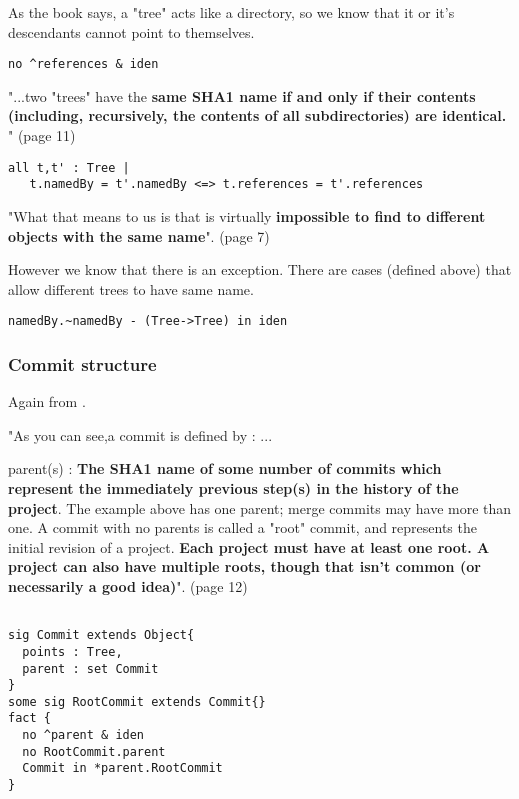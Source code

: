 As the book \cite{gitComm} says, a "tree" acts
like a directory, so we know that it or it's 
descendants cannot point to themselves.
\begin{lstlisting}
no ^references & iden 
\end{lstlisting}

"...two "trees" have the { \bf same SHA1 name if and only if their
contents (including, recursively, the contents of all subdirectories)
are identical.} " (page 11)

\begin{lstlisting}
all t,t' : Tree | 
   t.namedBy = t'.namedBy <=> t.references = t'.references
\end{lstlisting}

"What that means to us is that is virtually {\bf impossible to find to 
different objects with the same name}". (page 7) \par
However we know that there is an exception. 
There are cases (defined above)
that allow different trees to have same name. 

\begin{lstlisting}
namedBy.~namedBy - (Tree->Tree) in iden
\end{lstlisting}


\subsubsection{Commit structure}

Again from \cite{gitComm}. \par 
"As you can see,a commit is defined by :
... \par
parent(s) : {\bf The SHA1 name of some number of commits which
represent the immediately previous step(s) in the 
history of the project}. The example above has one parent;
merge commits may have more than one. A commit with no 
parents is called a "root" commit, and represents the 
initial revision of a project. {\bf Each project must have at
least one root. A project can also have multiple roots,
though that isn't common (or necessarily a good idea)}". (page 12)

\begin{lstlisting}

sig Commit extends Object{
  points : Tree,
  parent : set Commit
}
some sig RootCommit extends Commit{}
fact {
  no ^parent & iden
  no RootCommit.parent
  Commit in *parent.RootCommit
}

\end{lstlisting}

